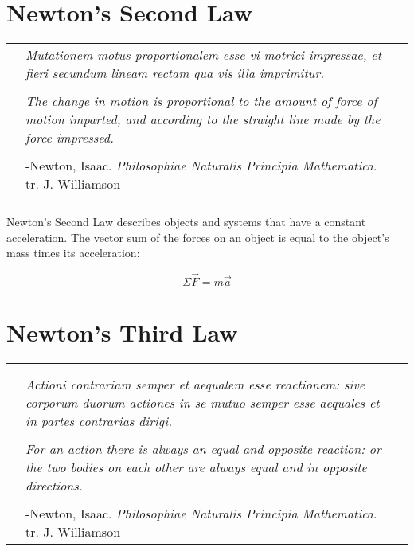 	\section{Newton's Second Law}
		\begin{tabular}{p{.75in} p{4.5in} p{.75in}}
		& \textit{Mutationem motus proportionalem esse vi motrici impressae, et fieri secundum lineam rectam qua vis illa imprimitur.} &  \\
		& & \\
		& \textit{The change in motion is proportional to the amount of force of motion imparted, and according to the straight line made by the force impressed. } & \\ 
		& & \\
		 & {-Newton, Isaac.  \textit{Philosophiae Naturalis Principia Mathematica}.  tr. J. Williamson} & \\		
		 	& & \\
	\end{tabular}

Newton's Second Law describes objects and systems that have a constant acceleration.  The vector sum of the forces on an object is equal to the object's mass times its acceleration:

				\begin{mdframed}[backgroundcolor=orange!20!white]
	\begin{equation}
		\Sigma \vec{F} = m \vec{a}  
		\label{eqn:newtonssecond}
	\end{equation}
\end{mdframed}
	
	
	
	\section{Newton's Third Law}
		\begin{tabular}{p{.75in} p{4.5in} p{.75in}}
		&  &  \\
		& & \\
		& \textit{Actioni contrariam semper et aequalem esse reactionem: sive corporum duorum actiones in se mutuo semper esse aequales et in partes contrarias dirigi. } & \\
		& & \\
		& \textit{For an action there is always an equal and opposite reaction: or the two bodies on each other are always equal and in opposite directions. } & \\
		& & \\
		 & {-Newton, Isaac.  \textit{Philosophiae Naturalis Principia Mathematica}.  tr. J. Williamson} & \\
		
	\end{tabular}
	
